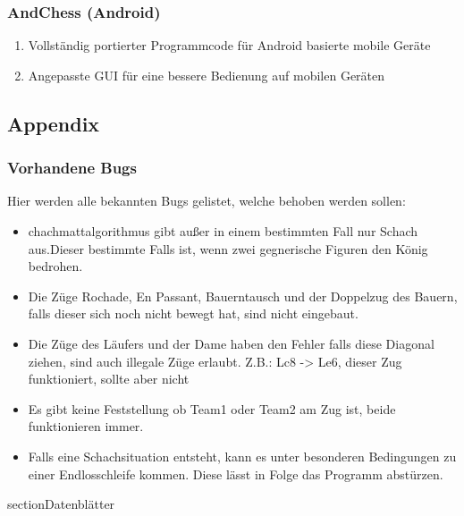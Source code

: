 \documentclass[12pt,a4paper]{article}
\begin{document}
{\subsubsection{AndChess (Android)}

\begin{enumerate}
	\item{Vollständig portierter Programmcode für Android basierte mobile Geräte}
	\item{Angepasste GUI für eine bessere Bedienung auf mobilen Geräten}
\end{enumerate}

\subsection{Appendix}
\subsubsection{Vorhandene Bugs}

Hier werden alle bekannten Bugs gelistet, welche behoben werden sollen:

\begin{itemize}
	\item{chachmattalgorithmus gibt außer in einem bestimmten Fall nur Schach aus.Dieser bestimmte Falls ist, wenn zwei gegnerische Figuren den König bedrohen.}
	\item{Die Züge Rochade, En Passant, Bauerntausch und der Doppelzug des Bauern, falls dieser sich noch nicht bewegt hat, sind nicht eingebaut.}
	\item{Die Züge des Läufers und der Dame haben den Fehler falls diese Diagonal ziehen, sind auch illegale Züge erlaubt. Z.B.: Lc8 -> Le6, dieser Zug funktioniert, sollte aber nicht}
	\item{Es gibt keine Feststellung ob Team1 oder Team2 am Zug ist, beide funktionieren immer.}
	\item{Falls eine Schachsituation entsteht, kann es unter besonderen Bedingungen zu einer Endlosschleife kommen. Diese lässt in Folge das Programm abstürzen.}
\end{itemize}


section{Datenblätter}
\label{SEC:DATASHEET}

}
\end{document}
